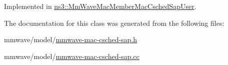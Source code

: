 Implemented in \hyperlink{classns3_1_1MmWaveMacMemberMacCschedSapUser_ae147a3c39cfd620ad5d90cbeec92d602}{ns3\+::\+Mm\+Wave\+Mac\+Member\+Mac\+Csched\+Sap\+User}.



The documentation for this class was generated from the following files\+:\begin{DoxyCompactItemize}
\item 
mmwave/model/\hyperlink{mmwave-mac-csched-sap_8h}{mmwave-\/mac-\/csched-\/sap.\+h}\item 
mmwave/model/\hyperlink{mmwave-mac-csched-sap_8cc}{mmwave-\/mac-\/csched-\/sap.\+cc}\end{DoxyCompactItemize}
